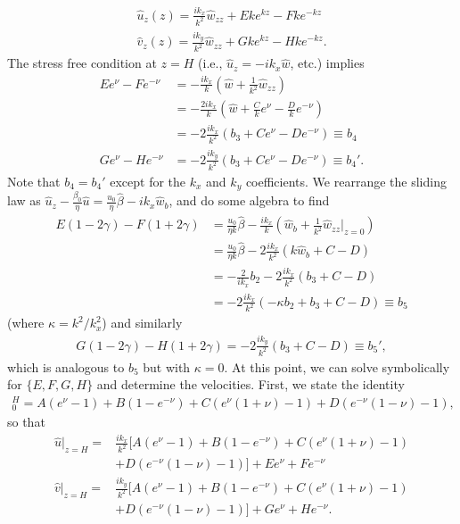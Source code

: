 \documentclass[paper=a4, fontsize=11pt]{article}
\begin{document}
\begin{align}
\widehat{u}_z(z) = \frac{ik_x }{k^2} \widehat{w}_{zz}
+ E k e^{kz} - F k e^{-kz} \\
\widehat{v}_z(z) = \frac{ik_y }{k^2} \widehat{w}_{zz} + G k  e^{kz} - H k e^{-kz}.
\end{align}
The stress free condition at $z=H$ (i.e., $\widehat{u}_z = -ik_x \widehat{w}$, etc.)
implies
\begin{align}
 E  e^{\nu} - F  e^{-\nu} &= -\frac{ik_x}{k} \left(\widehat{w}+\frac{1}{k^2}\widehat{w}_{zz}\right)\nonumber \\
 &= -\frac{2ik_x}{k} \left(\widehat{w}+ \frac{C}{k}e^{\nu} - \frac{D}{k}e^{-\nu} \right)\nonumber \\
  &= -2\frac{ik_x}{k^2} \left(b_3 + {C}e^{\nu} - {D}e^{-\nu} \right) \equiv b_4 \\
  G  e^{\nu} - H  e^{-\nu} &= -2\frac{ik_y}{k^2} \left(b_3+ {C}e^{\nu} - {D}e^{-\nu} \right) \equiv b_4'.
\end{align}
Note that $b_4=b_4'$ except for the $k_x$ and $k_y$ coefficients.
We rearrange the sliding law as $\widehat{u}_z - \frac{\beta_0}{\eta}\widehat{u}=\frac{u_0}{\eta}\widehat{\beta}
-ik_x\widehat{w}_b$, and do some algebra to find
\begin{align}
E (1-2\gamma) - F (1+2\gamma) &= \frac{u_0}{\eta k}\widehat{\beta}
-\frac{ik_x}{k}\left(\widehat{w}_b+ \frac{1}{k^2}\widehat{w}_{zz}|_{z=0}\right) \nonumber \\
&= \frac{u_0}{\eta k}\widehat{\beta} -2\frac{ik_x}{k^2}\left(k\widehat{w}_b + C-D\right) \nonumber \\
&= -\frac{2}{ik_x}b_2-2\frac{ik_x}{k^2}\left(b_3 + C-D\right)\nonumber\\
&= -2\frac{ik_x}{k^2}\left( -\kappa b_2 + b_3 + C-D\right) \equiv b_5
\end{align}
(where $\kappa = {k^2}/{k_x^2}$) and similarly
\begin{align}
G (1-2\gamma) -H (1+2\gamma) = -2\frac{ik_y}{k^2}\left(b_3 + C-D \right) \equiv b_5',
\end{align}
which is analogous to $b_5$ but with $\kappa=0$.
At this point, we can solve symbolically for $\{E,F,G,H\}$ and determine the velocities.
First, we state the identity
\begin{align}
[\widehat{w}_z]_0^H = A(e^\nu - 1) + B(1-e^{-\nu}) + C(e^\nu (1+\nu)-1) +D(e^{-\nu}(1-\nu)-1),
\end{align}
so that
\begin{align}
\widehat{u}|_{z=H} =&  \frac{ik_x }{k^2} [A(e^\nu - 1) + B(1-e^{-\nu}) + C(e^\nu (1+\nu)-1) \nonumber \\ &+D(e^{-\nu}(1-\nu)-1) ] + E e^{\nu} + F e^{-\nu}  \\
\widehat{v}|_{z=H} =& \frac{ik_y }{k^2} [A(e^\nu - 1) + B(1-e^{-\nu}) + C(e^\nu (1+\nu)-1) \nonumber \\ &+D(e^{-\nu}(1-\nu)-1) ] + G e^{\nu} + H e^{-\nu}.
\end{align}
\end{document}
